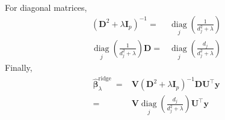 \documentclass[a4paper]{article}
\begin{document}
For diagonal matrices, 
\begin{equation}
	\begin{aligned}
		\left(\mathbf{D}^{2}+\lambda\mathbf{I}_p\right)^{-1} = & \underset{j}{\operatorname{diag}}\left(\frac{1}{d_j^2+\lambda}\right) \\ 
		\underset{j}{\operatorname{diag}}\left(\frac{1}{d_j^2+\lambda}\right)\mathbf D = & \underset{j}{\operatorname{diag}}\left(\frac{d_j}{d_j^2+\lambda}\right)
	\end{aligned}
\end{equation}
Finally, 
\begin{equation}
	\begin{aligned}
		\hat{\boldsymbol{\beta}}_\lambda^{\text {ridge }} = & \mathbf V \left(\mathbf{D}^{2}+\lambda\mathbf{I}_p\right)^{-1} \mathbf{D U}^{\top} \mathbf{y} \\
		= & \mathbf{V}\underset{j}{\operatorname{diag}}\left(\frac{d_j}{d_j^2+\lambda}\right) \mathbf{U}^{\top} \mathbf{y}
	\end{aligned}
\end{equation}
\end{document}
